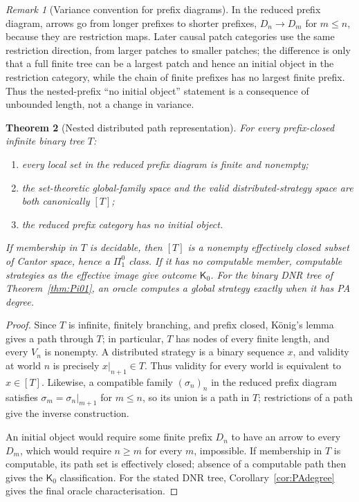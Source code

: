 \documentclass[11pt]{article}
\theoremstyle{plain}
\newtheorem{theorem}{Theorem}[section]
\theoremstyle{definition}
\theoremstyle{remark}
\newtheorem{remark}[theorem]{Remark}
\begin{document}
\begin{remark}[Variance convention for prefix diagrams]
In the reduced prefix diagram, arrows go from longer prefixes to shorter
prefixes, $D_n\to D_m$ for $m\le n$, because they are restriction maps. Later
causal patch categories use the same restriction direction, from larger patches
to smaller patches; the difference is only that a full finite tree can be a
largest patch and hence an initial object in the restriction category, while the
chain of finite prefixes has no largest finite prefix. Thus the nested-prefix
``no initial object'' statement is a consequence of unbounded length, not a
change in variance.
\end{remark}

\begin{theorem}[Nested distributed path representation]
\label{thm:nested-distributed-K}
For every prefix-closed infinite binary tree $T$:
\begin{enumerate}[label=(\roman*)]
\item every local set in the reduced prefix diagram is finite and nonempty;
\item the set-theoretic global-family space and the valid distributed-strategy
space are both canonically $[T]$;
\item the reduced prefix category has no initial object.
\end{enumerate}
If membership in $T$ is decidable, then $[T]$ is a nonempty effectively closed
subset of Cantor space, hence a $\Pi^0_1$ class. If it has no computable member,
computable strategies as the effective image give outcome $\mathsf K_0$. For the
binary DNR tree of Theorem~\ref{thm:Pi01}, an oracle computes a global strategy
exactly when it has PA degree.
\end{theorem}

\begin{proof}
Since $T$ is infinite, finitely branching, and prefix closed, König's lemma
\cite{konig} gives a path through $T$; in particular, $T$ has nodes of every finite length, and
every $V_n$ is nonempty. A distributed strategy is a binary
sequence $x$, and validity at world $n$ is precisely
$x|_{n+1}\in T$. Thus validity for every world is equivalent to $x\in[T]$.
Likewise, a compatible family $(\sigma_n)_n$ in the reduced prefix diagram
satisfies $\sigma_m=\sigma_n|_{m+1}$ for $m\le n$, so its union is a path in
$T$; restrictions of a path give the inverse construction.

An initial object would require
some finite prefix $D_n$ to have an arrow to every $D_m$, which would require
$n\ge m$ for every $m$, impossible. If membership in $T$ is computable, its
path set is effectively closed; absence of a computable path then gives the
$\mathsf K_0$ classification. For the stated DNR tree,
Corollary~\ref{cor:PAdegree} gives the final oracle characterisation.
\end{proof}
\end{document}
